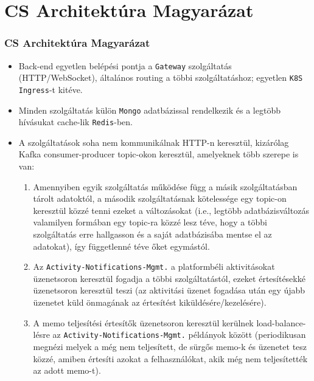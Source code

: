 \section{CS Architektúra Magyarázat}

\begin{frame}
    \frametitle{CS Architektúra Magyarázat}

    \begin{itemize}
        \item Back-end egyetlen belépési pontja a \texttt{Gateway} szolgáltatás (HTTP/WebSocket), általános routing a többi szolgáltatáshoz; egyetlen \texttt{K8S Ingress}-t kitéve.
        \item Minden szolgáltatás külön \texttt{Mongo} adatbázissal rendelkezik és a legtöbb hívásukat cache-lik \texttt{Redis}-ben.
        \item A szolgáltatások soha nem kommunikálnak HTTP-n keresztül, kizárólag Kafka consumer-producer topic-okon keresztül, amelyeknek több szerepe is van:
              \begin{enumerate}
                  \item Amennyiben egyik szolgáltatás működése függ a másik szolgáltatásban tárolt adatoktól, a második szolgáltatásnak kötelessége egy topic-on keresztül közzé tenni ezeket a változásokat (i.e., legtöbb adatbázisváltozás valamilyen formában egy topic-ra közzé lesz téve, hogy a többi szolgáltatás erre hallgasson és a saját adatbázisába mentse el az adatokat), így függetlenné téve őket egymástól.
                  \item Az \texttt{Activity-Notifications-Mgmt.} a platformbéli aktivitásokat üzenetsoron keresztül fogadja a többi szolgáltatástól, ezeket értesítésekké üzenetsoron keresztül teszi (az aktivitási üzenet fogadása után egy újabb üzenetet küld önmagának az értesítést kiküldésére/kezelésére).
                  \item A memo teljesítési értesítők üzenetsoron keresztül kerülnek load-balance-lésre az \texttt{Activity-Notifications-Mgmt.} példányok között (periodikusan megnézi melyek a még nem teljesített, de sürgős memo-k és üzenetet tesz közzé, amiben értesíti azokat a felhasználókat, akik még nem teljesítették az adott memo-t).
              \end{enumerate}
    \end{itemize}
\end{frame}

